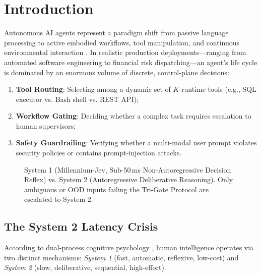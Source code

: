 \documentclass[11pt,a4paper]{article}
\begin{document}
\section{Introduction}

Autonomous AI agents represent a paradigm shift from passive language processing to active embodied workflows, tool manipulation, and continuous environmental interaction \cite{wang2024survey, xi2023rise}. In realistic production deployments—ranging from automated software engineering to financial risk dispatching—an agent's life cycle is dominated by an enormous volume of discrete, control-plane decisions:
\begin{enumerate}
    \item \textbf{Tool Routing}: Selecting among a dynamic set of $K$ runtime tools (e.g., SQL executor vs. Bash shell vs. REST API);
    \item \textbf{Workflow Gating}: Deciding whether a complex task requires escalation to human supervisors;
    \item \textbf{Safety Guardrailing}: Verifying whether a multi-modal user prompt violates security policies or contains prompt-injection attacks.
\end{enumerate}

\begin{figure}[t]
\centering
{}
\caption{System 1 (Millennium-Jev, Sub-50\,ms Non-Autoregressive Decision Reflex) vs. System 2 (Autoregressive Deliberative Reasoning). Only ambiguous or OOD inputs failing the Tri-Gate Protocol are escalated to System 2.}
\label{fig:dual_process}
\end{figure}

\subsection{The System 2 Latency Crisis}
According to dual-process cognitive psychology \cite{kahneman2011thinking}, human intelligence operates via two distinct mechanisms: \textit{System 1} (fast, automatic, reflexive, low-cost) and \textit{System 2} (slow, deliberative, sequential, high-effort). 
\end{document}
